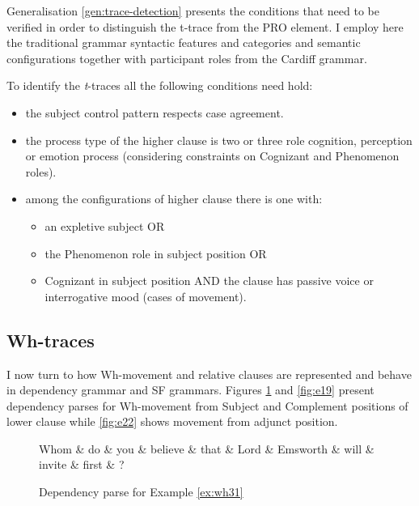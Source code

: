     Generalisation \ref{gen:trace-detection} presents the conditions that need to be verified in order to distinguish the t-trace from the PRO element. I employ here the traditional grammar syntactic features and categories and semantic configurations together with participant roles from the Cardiff grammar. 

    \begin{generalization}\label{gen:trace-detection}
        To identify the \textit{t}-traces all the following conditions need hold:
        \begin{itemize}
            \item the subject control pattern respects case agreement.
            \item the process type of the higher clause is two or three role cognition, perception or emotion process (considering constraints on Cognizant and Phenomenon roles). 
            \item among the configurations of higher clause there is one with:
            \begin{itemize}
                \item an expletive subject OR
                \item the Phenomenon role in subject position OR
                \item Cognizant in subject position AND the clause has passive voice or interrogative mood (cases of movement).
            \end{itemize}
        \end{itemize}
    \end{generalization}


\subsection{Wh-traces}
\label{sec:wh-traces}
    I now turn to how Wh-movement and relative clauses are represented and behave in dependency grammar and SF grammars. Figures \ref{fig:e18} and \ref{fig:e19} present dependency parses for Wh-movement from Subject and Complement positions of lower clause while \ref{fig:e22} shows movement from adjunct position.

    \begin{figure}[!ht]
    	\centering
    	\begin{dependency}
    		\begin{deptext}[]
    			Whom \& do \& you \& believe \& that \& Lord \& Emsworth \& will \& invite \& first \& ?\\
    		\end{deptext}
    	\end{dependency}
    	\caption{Dependency parse for Example \ref{ex:wh31}}
    	\label{fig:e18}
    \end{figure}
    
